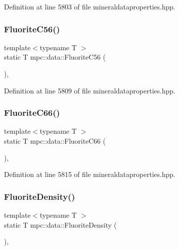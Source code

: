 Definition at line 5803 of file mineraldataproperties.\+hpp.

\mbox{\label{namespacempc_1_1data_a37ccc062d97d121462cd8821adfc48ce}} 
\subsubsection{\texorpdfstring{Fluorite\+C56()}{FluoriteC56()}}
{\footnotesize\ttfamily template$<$typename T $>$ \\
static T mpc\+::data\+::\+Fluorite\+C56 (\begin{DoxyParamCaption}{ }\end{DoxyParamCaption})\hspace{0.3cm}{\ttfamily [inline]}, {\ttfamily [static]}}



Definition at line 5809 of file mineraldataproperties.\+hpp.

\mbox{\label{namespacempc_1_1data_afed8baf0b0afd43e83c288db108754c9}} 
\subsubsection{\texorpdfstring{Fluorite\+C66()}{FluoriteC66()}}
{\footnotesize\ttfamily template$<$typename T $>$ \\
static T mpc\+::data\+::\+Fluorite\+C66 (\begin{DoxyParamCaption}{ }\end{DoxyParamCaption})\hspace{0.3cm}{\ttfamily [inline]}, {\ttfamily [static]}}



Definition at line 5815 of file mineraldataproperties.\+hpp.

\mbox{\label{namespacempc_1_1data_aa6e521c73f6952b9d452233407da9b20}} 
\subsubsection{\texorpdfstring{Fluorite\+Density()}{FluoriteDensity()}}
{\footnotesize\ttfamily template$<$typename T $>$ \\
static T mpc\+::data\+::\+Fluorite\+Density (\begin{DoxyParamCaption}{ }\end{DoxyParamCaption})\hspace{0.3cm}{\ttfamily [inline]}, {\ttfamily [static]}}



